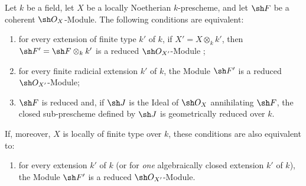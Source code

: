 \begin{proposition}[4.6.16]
\label{IV.4.6.16}
Let $k$ be a field, let $X$ be a locally Noetherian $k$-prescheme,
and let $\sh F$ be a coherent $\sh O_X$-Module.
The following conditions are equivalent:
\begin{enumerate}
\item[\rm(a)]
\label{IV.4.6.16.a}
for every extension of finite type $k'$ of $k$, if
$X'=X\otimes_k k'$, then
$\sh F'=\sh F\otimes_k k'$ is a reduced
$\sh O_{X'}$-Module ;

\item[\rm(b)]
\label{IV.4.6.16.b}
for every finite radicial extension $k'$ of $k$, the Module $\sh F'$
is a reduced $\sh O_{X'}$-Module;

\item[\rm(c)]
\label{IV.4.6.16.c}
$\sh F$ is reduced and, if $\sh J$ is the Ideal of $\sh O_X$
annihilating $\sh F$, the closed sub-prescheme defined by $\sh J$ is
geometrically reduced over $k$.
\end{enumerate}
If, moreover, $X$ is locally of finite type over $k$, these conditions
are also equivalent to:
\begin{enumerate}
\item[\rm(d)]
\label{IV.4.6.16.d}
for every extension $k'$ of $k$
\textup{(or} for \emph{one} algebraically closed extension $k'$ of $k$), the Module
$\sh F'$ is a reduced $\sh O_{X'}$-Module.
\end{enumerate}
\end{proposition}

